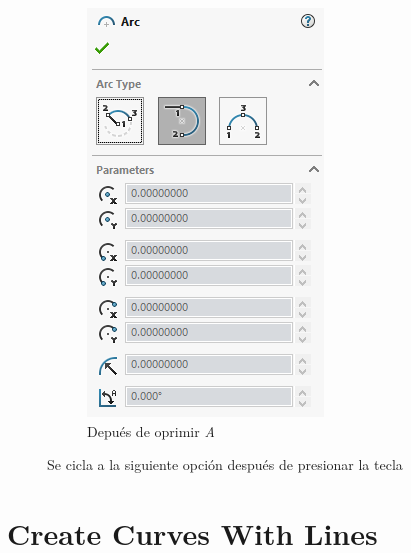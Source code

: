 \documentclass{report}
\begin{document}
\begin{figure}[H]
\begin{subfigure}[b]{0.45\textwidth}
		\includegraphics[width=\textwidth]{Imagenes/solidworks_ciclarcona02}
		\caption{Depués de oprimir \emph{A}}
		\label{fig:solidworksciclarcona02}
	\end{subfigure}
	\caption{Se cicla a la siguiente opción después de presionar la tecla}
\end{figure}

\chapter{Create Curves With Lines}
\end{document}
